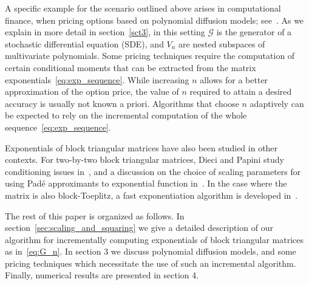 A specific example for the scenario outlined above arises in computational finance, when pricing options
based on polynomial diffusion models; see~\cite{filipovic2016polynomial}. As we explain in more detail in section~\ref{sct3}, in this setting $\mathcal{G}$ is the generator of a stochastic differential equation (SDE), and $V_n$ are nested subspaces of multivariate polynomials.
Some pricing techniques require the computation of certain conditional moments that can be extracted from the matrix exponentials~\eqref{eq:exp_sequence}.
While increasing $n$ allows for a better approximation of the option price, the value of $n$ required to attain a desired accuracy is usually not known a priori. Algorithms that choose $n$ adaptively can be expected to rely on the incremental computation  of the whole sequence~\eqref{eq:exp_sequence}. 

Exponentials of block triangular matrices have also been studied in other contexts.  For two-by-two block triangular matrices, Dieci and
Papini study conditioning issues in~\cite{Dieci2001}, and a discussion
on the choice of scaling parameters for using Pad\'e approximants to
exponential function in~\cite{Dieci2000}.  In the case where the
matrix is also block-Toeplitz, a fast exponentiation algorithm is
developed in~\cite{Bini2016}.

The rest of this paper is organized as follows. In
section~\ref{sec:scaling_and_squaring} we give a detailed
description of our algorithm for incrementally computing exponentials
of block triangular matrices as in~\eqref{eq:G_n}. In section 3 we
discuss polynomial diffusion models, and some pricing
techniques which necessitate the use of such an incremental algorithm. Finally, 
numerical results are presented in section 4.
